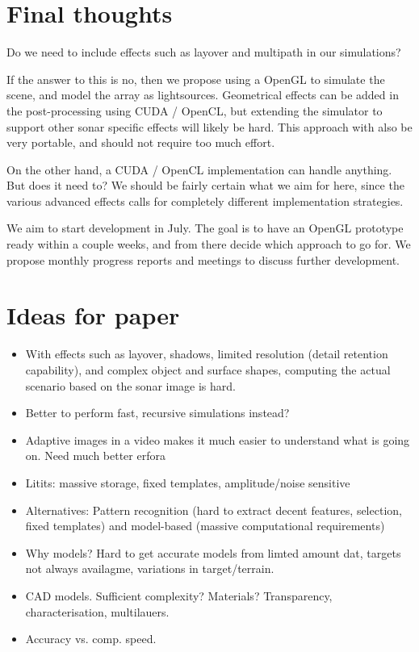 \documentclass[
   article                                      %
 , 12pt                                         %
 , xelatex                                      %
 , bibtex                                       %
 , layout
]{common/mytemplate}
\begin{document}
\section{Final thoughts}

Do we need to include effects such as layover and multipath in our simulations?

If the answer to this is no, then we propose using a OpenGL to simulate the scene, and model the array as lightsources. Geometrical effects can be added in the post-processing using CUDA / OpenCL, but extending the simulator to support other sonar specific effects will likely be hard. This approach with also be very portable, and should not require too much effort.

On the other hand, a CUDA / OpenCL implementation can handle anything. But does it need to? We should be fairly certain what we aim for here, since the various advanced effects calls for completely different implementation strategies.

We aim to start development in July. The goal is to have an OpenGL prototype ready within a couple weeks, and from there decide which approach to go for. We propose monthly progress reports and meetings to discuss further development.




\newpage

\section{Ideas for paper}

\begin{itemize}
\item With effects such as layover, shadows, limited resolution (detail retention capability), and complex object and surface shapes, computing the actual scenario based on the sonar image is hard.
\item Better to perform fast, recursive simulations instead?
\item Adaptive images in a video makes it much easier to understand what is going on. Need much better erfora
\item Litits: massive storage, fixed templates, amplitude/noise sensitive
\item Alternatives: Pattern recognition (hard to extract decent features, selection, fixed templates) and model-based (massive computational requirements)
\item Why models? Hard to get accurate models from limted amount dat, targets not always availagme, variations in target/terrain.
\item CAD models. Sufficient complexity? Materials? Transparency, characterisation, multilauers.
\item Accuracy vs. comp. speed.
\end{itemize}

\newpage


% 
\end{document}
